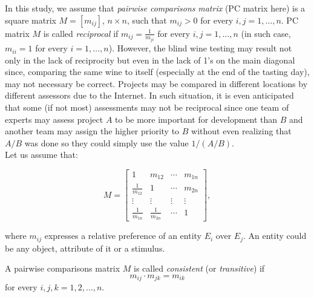 \documentclass [12pt]{article}
\theoremstyle{definition}
\begin{document}
In this study, we assume that {\em pairwise comparisons} {\em matrix} (PC matrix here) is a square matrix $M=[m_{ij}]$, $n \times n$, such that $m_{ij}>0$ for every $i,j=1, \ldots ,n$. PC matrix $M$ is called {\em 
reciprocal} if $m_{ij} = \frac{1}{m_{ji}}$ for every $i,j=1, \ldots ,n$
(in such case, $m_{ii}=1$ for every $i=1, \ldots ,n $). However, the blind wine testing may result not only in the lack of reciprocity but even in the lack of 1's on the main diagonal since, comparing the same wine to itself (especially at the end of the tasting day), may not necessary be correct. Projects may be compared in different locations by different assessors due to the Internet. In such situation, it is even anticipated that some (if not most) assessments may not be reciprocal since one team of experts may assess project $A$ to be more important for development than $B$ and another team may assign the higher priority to $B$ without even realizing that $A/B$ was done so they could simply use the value $1/(A/B) $.
\\

Let us assume that:

\begin{displaymath}
M = \begin{bmatrix}
1 & m_{12} & \cdots & m_{1n} \\ 
\frac{1}{m_{12}} & 1 & \cdots & m_{2n} \\ 
\vdots & \vdots & \vdots & \vdots \\ 
\frac{1}{m_{1n}} & \frac{1}{m_{2n}} & \cdots & 1
\end{bmatrix},
\end{displaymath}

\noindent where $m_{ij}$ expresses a relative preference of an entity $E_i$ over $E_j$. An entity could be any object, attribute of it or a stimulus.

A pairwise comparisons matrix $M$ is called {\em consistent} (or {\em transitive}) if 
$$m_{ij} \cdot m_{jk}=m_{ik}$$ for every $i,j,k=1,2, \ldots ,n$. \\
\end{document}
